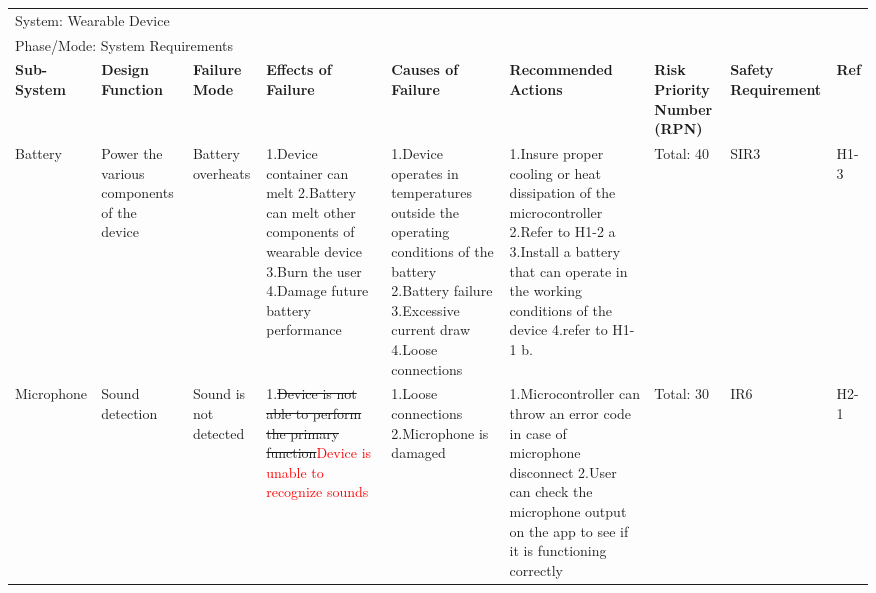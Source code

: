 \documentclass[12pt, titlepage]{article}
\begin{document}
\begin{landscape}
\begin{table}[H]
\begin{tabular}{| p{} | p{}  | p{} | p{} | p{} | p{} | p{} | p{} | p{} |}
    \end{tabular}
    \hspace*{-1cm}
\end{table}
    
\begin{table}[H]
    \centering
        
        \begin{tabular}{| p{} | p{}  | p{} | p{} | p{} | p{} | p{} | p{} | p{} |}
        \hline
        
        \multicolumn{9}{|l|}{System: Wearable Device} \\
        \multicolumn{9}{|l|}{Phase/Mode: System Requirements} \\ \hline
        \textbf{Sub-System} & \textbf{Design Function} & \textbf{Failure Mode} & \textbf{Effects of Failure} & \textbf{Causes of Failure} & \textbf{Recommended Actions} & \textbf{Risk Priority Number (RPN)} & \textbf{Safety Requirement} & \textbf{Ref} \\ \hline
    
        Battery & Power the various components of the device  &  Battery overheats & 1.Device container can melt \newline 2.Battery can melt other components of wearable device \newline 3.Burn the user \newline 4.Damage future battery performance & 1.Device operates in temperatures outside the operating conditions of the battery \newline 2.Battery failure \newline 3.Excessive current draw \newline 4.Loose connections  & 1.Insure proper cooling or heat dissipation of the microcontroller \newline 2.Refer to H1-2 a \newline 3.Install a battery that can operate in the working conditions of the device \newline 4.refer to H1-1 b. & Total: 40 & SIR3 & H1-3 \\ \hline
    
         Microphone & Sound detection & Sound is not detected & 1.\sout{Device is not able to perform the primary function}\textcolor{red}{Device is unable to recognize sounds}  & 1.Loose connections \newline 2.Microphone is damaged  & 1.Microcontroller can throw an error code in case of microphone disconnect \newline 2.User can check the microphone output on the app to see if it is functioning correctly & Total: 30  & IR6  & H2-1 \\ \cline{3-9}
    

\end{tabular}
\end{table}
\end{landscape}
\end{document}
